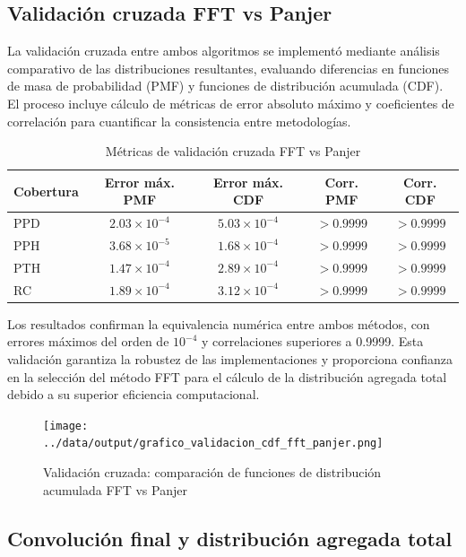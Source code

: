 \subsection{Validación cruzada FFT vs Panjer}

La validación cruzada entre ambos algoritmos se implementó mediante análisis comparativo de las distribuciones resultantes, evaluando diferencias en funciones de masa de probabilidad (PMF) y funciones de distribución acumulada (CDF). El proceso incluye cálculo de métricas de error absoluto máximo y coeficientes de correlación para cuantificar la consistencia entre metodologías.

\begin{table}[H]
\centering
\caption{Métricas de validación cruzada FFT vs Panjer}
\begin{tabular}{lcccc}
\hline
\textbf{Cobertura} & \textbf{Error máx. PMF} & \textbf{Error máx. CDF} & \textbf{Corr. PMF} & \textbf{Corr. CDF} \\
\hline
PPD & $2.03 \times 10^{-4}$ & $5.03 \times 10^{-4}$ & $>0.9999$ & $>0.9999$ \\
PPH & $3.68 \times 10^{-5}$ & $1.68 \times 10^{-4}$ & $>0.9999$ & $>0.9999$ \\
PTH & $1.47 \times 10^{-4}$ & $2.89 \times 10^{-4}$ & $>0.9999$ & $>0.9999$ \\
RC & $1.89 \times 10^{-4}$ & $3.12 \times 10^{-4}$ & $>0.9999$ & $>0.9999$ \\
\hline
\end{tabular}
\end{table}

Los resultados confirman la equivalencia numérica entre ambos métodos, con errores máximos del orden de $10^{-4}$ y correlaciones superiores a 0.9999. Esta validación garantiza la robustez de las implementaciones y proporciona confianza en la selección del método FFT para el cálculo de la distribución agregada total debido a su superior eficiencia computacional.

\begin{figure}[H]
\centering
\texttt{[image: ../data/output/grafico\_validacion\_cdf\_fft\_panjer.png]}
\caption{Validación cruzada: comparación de funciones de distribución acumulada FFT vs Panjer}
\end{figure}

\subsection{Convolución final y distribución agregada total}


